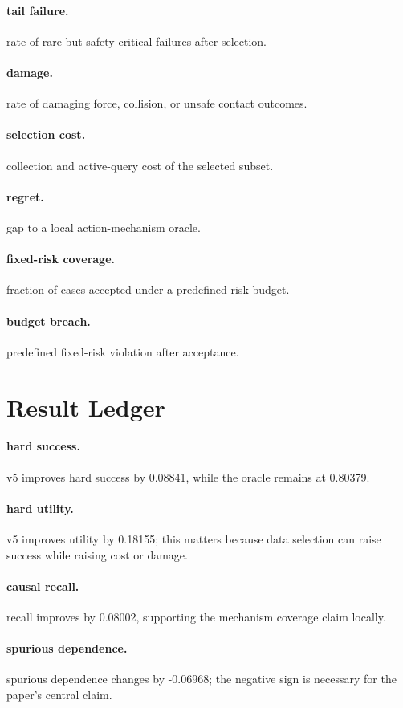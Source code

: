 \documentclass{article}
\begin{document}
\paragraph{tail failure.} rate of rare but safety-critical failures after selection.
\paragraph{damage.} rate of damaging force, collision, or unsafe contact outcomes.
\paragraph{selection cost.} collection and active-query cost of the selected subset.
\paragraph{regret.} gap to a local action-mechanism oracle.
\paragraph{fixed-risk coverage.} fraction of cases accepted under a predefined risk budget.
\paragraph{budget breach.} predefined fixed-risk violation after acceptance.
\section{Result Ledger}
\paragraph{hard success.} v5 improves hard success by 0.08841, while the oracle remains at 0.80379.
\paragraph{hard utility.} v5 improves utility by 0.18155; this matters because data selection can raise success while raising cost or damage.
\paragraph{causal recall.} recall improves by 0.08002, supporting the mechanism coverage claim locally.
\paragraph{spurious dependence.} spurious dependence changes by -0.06968; the negative sign is necessary for the paper's central claim.
\end{document}
